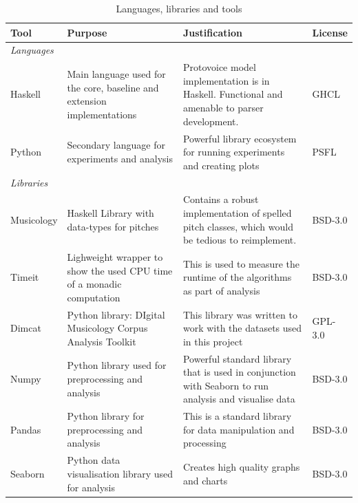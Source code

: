 \documentclass[12pt,a4paper,twoside,openany]{report} \usepackage[pdfborder={0 0 0}]{hyperref}    %
\theoremstyle{definition} \newtheorem{definition}{Definition}[section]
\begin{document}
    \begin{table}[ht!] \caption{Languages, libraries and tools} \label{tab:languages} \centering \footnotesize
      \renewcommand{\arraystretch}{1.3} \begin{tabularx}{\textwidth}{p{4em}X X p{4em}} {\normalsize \textbf{Tool}}
      & {\normalsize \textbf{Purpose}} & {\normalsize\textbf{Justification}} & {\normalsize \textbf{License}} \\
        \toprule \textit{Languages} &&&\\ Haskell & Main language used for the core, baseline and extension
        implementations & Protovoice model implementation is in Haskell. Functional and amenable to parser development.
                        & GHCL \\

        Python & Secondary language for experiments and analysis & Powerful library ecosystem for running experiments
        and creating plots & PSFL \\

        \midrule \textit{Libraries} &&&\\ Musicology & Haskell Library with data-types for pitches & Contains a robust
        implementation of spelled pitch classes, which would be tedious to reimplement. & BSD-3.0 \\ Timeit & Lighweight
        wrapper to show the used CPU time of a monadic computation & This is used to measure the runtime of the algorithms
        as part of analysis & BSD-3.0 \\ Dimcat & Python library: DIgital Musicology Corpus Analysis Toolkit & This
        library was written to work with the datasets used in this project & GPL-3.0 \\ Numpy & Python library used for
        preprocessing and analysis & Powerful standard library that is used in conjunction with Seaborn to run analysis
        and visualise data & BSD-3.0 \\ Pandas & Python library for preprocessing and analysis & This is a standard
        library for data manipulation and processing & BSD-3.0 \\ Seaborn & Python data visualisation library used for
        analysis & Creates high quality graphs and charts & BSD-3.0 \\ \midrule


\end{tabularx}
\end{table}
\end{document}
